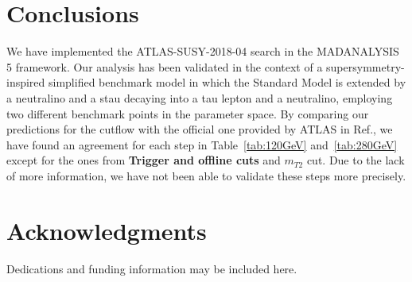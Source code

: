 \documentclass{ws-mpla}
\begin{document}
\section{Conclusions}

We have implemented the ATLAS-SUSY-2018-04 search in the MADANALYSIS 5 framework. Our analysis has been validated in the context of a supersymmetry-inspired simplified benchmark model in which the Standard Model is extended by a neutralino and a stau decaying into a tau lepton and a neutralino, employing two different benchmark points in the parameter space.
By comparing our predictions for the cutflow with the official one provided by ATLAS in Ref.\cite{Aad:2019byo}, we have found an agreement for each step in Table~\ref{tab:120GeV} and~\ref{tab:280GeV} except for the ones from \textbf{Trigger and offline cuts} and $m_{T2}$ cut. Due to the lack of more information, we have not been able to validate these steps more precisely.


\section*{Acknowledgments}
Dedications and funding information may be included here.
\end{document}
